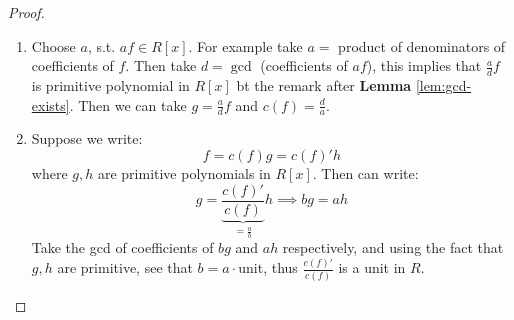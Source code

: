 \begin{proof}
	\leavevmode
	\begin{enumerate}
		\item Choose \( a \), s.t. \( af \in R[x] \). For example take \( a = \) product of denominators
		      of coefficients of \( f \). Then take \( d = \gcd \) (coefficients of \( af \)), this implies
		      that \( \frac{a}{d}f \) is primitive polynomial in \( R[x] \) bt the remark after
		      \textbf{Lemma} \ref{lem:gcd-exists}. Then we can take \( g = \frac{a}{d}f
		      \) and \( c(f) = \frac{d}{a} \).
		\item Suppose we write:
		      \[
			      f = c(f) g = c(f)'h
		      \]
		      where \( g,h \) are primitive polynomials in \( R[x] \). Then can write:
		      \[
			      g = \underbrace{\frac{c(f)'}{c(f)}}_{=\frac{a}{b}} h \implies bg = ah
		      \]
		      Take the gcd of coefficients of \( bg \) and \( ah \) respectively, and using the fact
		      that \( g,h \) are primitive, see that \( b = a \cdot \)unit, thus \( \frac{c(f)'}{c(f)} \)
		      is a unit in \( R \).
	\end{enumerate}
\end{proof}
